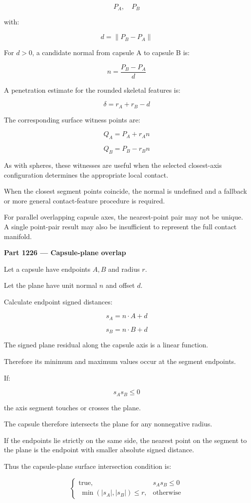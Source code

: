 \[
P_A,\quad P_B
\]

with:

\[
d=\|P_B-P_A\|
\]

For \(d>0\), a candidate normal from capsule A to capsule B is:

\[
\boxed{ n=\frac{P_B-P_A}{d} }
\]

A penetration estimate for the rounded skeletal features is:

\[
\boxed{ \delta=r_A+r_B-d }
\]

The corresponding surface witness points are:

\[
Q_A=P_A+r_An
\]

\[
Q_B=P_B-r_Bn
\]

As with spheres, these witnesses are useful when the selected closest-axis configuration determines the appropriate local contact.

When the closest segment points coincide, the normal is undefined and a fallback or more general contact-feature procedure is required.

For parallel overlapping capsule axes, the nearest-point pair may not be unique. A single point-pair result may also be insufficient to represent the full contact manifold.

\textbf{Part 1226 --- Capsule-plane overlap}

Let a capsule have endpoints \(A,B\) and radius \(r\).

Let the plane have unit normal \(n\) and offset \(d\).

Calculate endpoint signed distances:

\[
s_A=n\cdot A+d
\]

\[
s_B=n\cdot B+d
\]

The signed plane residual along the capsule axis is a linear function.

Therefore its minimum and maximum values occur at the segment endpoints.

If:

\[
s_As_B\le0
\]

the axis segment touches or crosses the plane.

The capsule therefore intersects the plane for any nonnegative radius.

If the endpoints lie strictly on the same side, the nearest point on the segment to the plane is the endpoint with smaller absolute signed distance.

Thus the capsule-plane surface intersection condition is:

\[
\boxed{ \begin{cases} \text{true},&s_As_B\le0\\\ \min(|s_A|,|s_B|)\le r,&\text{otherwise} \end{cases} }
\]

